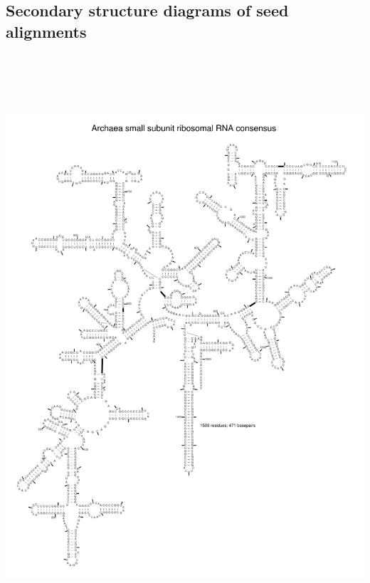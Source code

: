 \subsection{Secondary structure diagrams of seed alignments}


\includegraphics[height=8.5in]{../../seeds/ss-diagrams/archaea-0p1}
